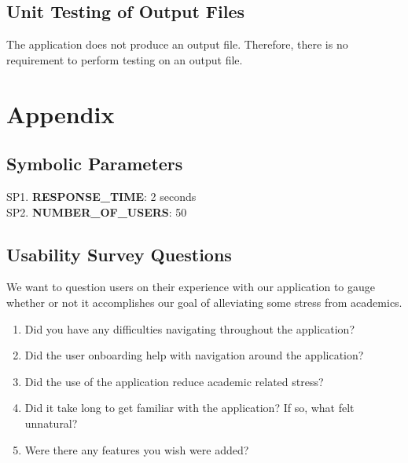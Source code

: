 \documentclass[12pt, titlepage]{article}
\begin{document}
\subsection{Unit Testing of Output Files}

The application does not produce an output file. Therefore, there is no requirement to perform testing on an output file.

\section{Appendix}

\subsection{Symbolic Parameters}

SP1. \textbf{RESPONSE\_TIME}: 2 seconds\\
SP2. \textbf{NUMBER\_OF\_USERS}: 50

\subsection{Usability Survey Questions}

We want to question users on their experience with our application to gauge whether or not it accomplishes our goal of alleviating some stress from academics. \\

\begin{enumerate}
\item{Did you have any difficulties navigating throughout the application?}
\item{Did the user onboarding help with navigation around the application?}
\item{Did the use of the application reduce academic related stress?}
\item{Did it take long to get familiar with the application? If so, what felt unnatural?}
\item{Were there any features you wish were added?}
\end{enumerate}
\end{document}
